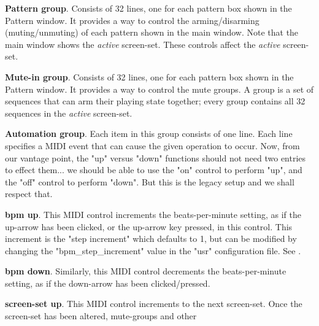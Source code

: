    \begin{enumber}
      \item \textbf{Pattern group}.
         Consists of 32 lines, one for each
         pattern box shown in the Pattern window.
         It provides a way to control the arming/disarming (muting/unmuting) of
         each pattern shown in the main window.  Note that the main window
         shows the \textsl{active} screen-set.  These controls affect the
         \textsl{active} screen-set.
      \item \textbf{Mute-in group}.
         Consists of 32 lines, one for each
         pattern box shown in the Pattern window.
         It provides a way to control the mute groups.
         A group is a set of sequences that can arm their playing state
         together; every group contains all 32 sequences in the
         \textsl{active} screen-set.
      \item \textbf{Automation group}.
         Each item in this group consists of one line.  Each line
         specifies a MIDI event that can cause the given operation to occur.
         Now, from our vantage point, the "up" versus "down" functions should
         not need two entries to effect them... we should be able to use the
         "on" control to perform "up", and the "off" control to perform "down".
         But this is the legacy setup and we shall respect that.
         \begin{enumber}
            \item \textbf{bpm up}.
               This MIDI control increments the beats-per-minute setting, as if
               the up-arrow has been clicked, or the up-arrow key pressed, in
               this control.  This increment is the
               "step increment" which defaults to 1, but can be modified by
               changing the "bpm\_step\_increment" value in the "usr"
               configuration file.
               See .
            \item \textbf{bpm down}.
               Similarly, this MIDI control decrements the beats-per-minute
               setting, as if the down-arrow has been clicked/pressed.
            \item \textbf{screen-set up}.
               This MIDI control increments to the next screen-set. 
               Once the screen-set has been altered, mute-groups and other

\end{enumber}
\end{enumber}
